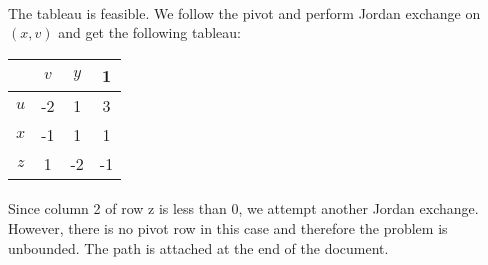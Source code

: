 \paragraph{}
The tableau is feasible. We follow the pivot and perform Jordan exchange on $(x, v)$ and get the following tableau:
\begin{center}
	\begin{tabular}{ c | c  c | c }
		\hline
		\ &  $v$  & $y$ &  1\\ \hline
		$u$ & -2 &  1 &  3\\ 
		$x$ & -1 &  1 &  1\\ \hline
		$z$ &  1 & -2 & -1\\
		\hline
	\end{tabular}
\end{center}
\paragraph{}
Since column 2 of row z is less than 0, we attempt another Jordan exchange. However, there is no pivot row in this case and therefore the problem is unbounded. The path is attached at the end of the document.